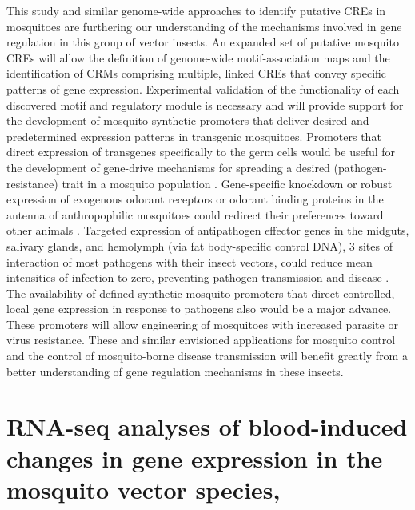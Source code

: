 This study and similar genome-wide approaches to identify putative \glspl{CRE} in mosquitoes \cite{Hernandez-Romano2008} are furthering our understanding of the mechanisms involved in gene regulation in this group of vector insects. An expanded set of putative mosquito \glspl{CRE} will allow the definition of genome-wide motif-association maps and the identification of \glspl{CRM} comprising multiple, linked \glspl{CRE} that convey specific patterns of gene expression. Experimental validation of the functionality of each discovered motif and regulatory module is necessary and will provide support for the development of mosquito synthetic promoters that deliver desired and predetermined expression patterns in transgenic mosquitoes. Promoters that direct expression of transgenes specifically to the germ cells would be useful for the development of gene-drive mechanisms for spreading a desired (pathogen-resistance) trait in a mosquito population \cite{Adelman2007}. Gene-specific knockdown or robust expression of exogenous odorant receptors or odorant binding proteins in the antenna of \gls{anthropophilic} mosquitoes could redirect their preferences toward other animals \cite{Xu2005a}. Targeted expression of antipathogen effector genes in the \glspl{midgut}, salivary glands, and \gls{hemolymph} (via fat body-specific control DNA), 3 sites of interaction of most pathogens with their insect vectors, could reduce mean intensities of infection to zero, preventing pathogen transmission and disease \cite{Jasinskiene2007}. The availability of defined synthetic mosquito promoters that direct controlled, local gene expression in response to pathogens also would be a major advance. These promoters will allow engineering of mosquitoes with increased parasite or virus resistance. These and similar envisioned applications for mosquito control and the control of mosquito-borne disease transmission will benefit greatly from a better understanding of gene regulation mechanisms in these insects.










\pagebreak

\section{RNA-seq analyses of blood-induced changes in gene expression in the mosquito vector species, \Aea\ \cite{Bonizzoni2011}}



